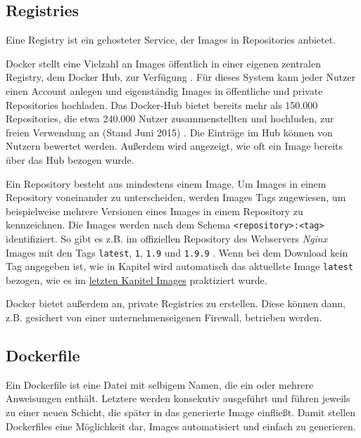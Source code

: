 \documentclass[../main.tex]{subfiles}
\begin{document}

    \subsection{Registries}
      Eine Registry ist ein gehosteter Service, der Images in Repositories anbietet.

      Docker stellt eine Vielzahl an Images öffentlich in einer eigenen zentralen Registry, dem Docker Hub, zur Verfügung \cite[S.11]{dockerBook}\cite[S.3]{dockerSec1}. Für dieses System kann jeder Nutzer einen Account anlegen und eigenständig Images in öffentliche und private Repositories hochladen. Das Docker-Hub bietet bereits mehr als 150.000 Repositories, die etwa 240.000 Nutzer zusammenstellten und hochluden, zur freien Verwendung an (Stand Juni 2015) \cite[S.16]{slideshareDockercon15}. Die Einträge im Hub können von Nutzern bewertet werden. Außerdem wird angezeigt, wie oft ein Image bereits über das Hub bezogen wurde.

      Ein Repository besteht aus mindestens einem Image. Um Images in einem Repository voneinander zu unterscheiden, werden Images Tags zugewiesen, um beispielweise mehrere Versionen eines Images in einem Repository zu kennzeichnen. Die Images werden nach dem Schema \texttt{<repository>:<tag>} identifiziert. So gibt es z.B. im offiziellen Repository des Webservers \emph{Nginx} Images mit den Tags \texttt{latest}, \texttt{1}, \texttt{1.9} und \texttt{1.9.9} \cite{dockerhubNginx}. Wenn bei dem Download kein Tag angegeben ist, wie in Kapitel wird automatisch das aktuellste Image \texttt{latest} bezogen, wie es im \hyperref[dockerImages]{letzten Kapitel \glqq{}Images\grqq{}} praktiziert wurde.





      Docker bietet außerdem an, private Registries zu erstellen. Diese können dann, z.B. gesichert von einer unternehmenseigenen Firewall, betrieben werden.
    \subsection{Dockerfile}
      Ein Dockerfile ist eine Datei mit selbigem Namen, die ein oder mehrere Anweisungen enthält. Letztere werden konsekutiv ausgeführt und führen jeweils zu einer neuen Schicht, die später in das generierte Image einfließt. Damit stellen Dockerfiles eine Möglichkeit dar, Images automatisiert und einfach zu generieren.
\end{document}
